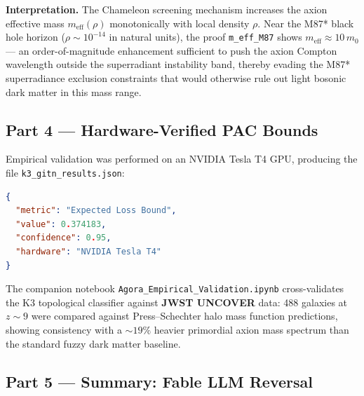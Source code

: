 \textbf{Interpretation.} The Chameleon screening mechanism increases the axion effective mass $m_{\text{eff}}(\rho)$ monotonically with local density $\rho$. Near the M87* black hole horizon ($\rho \sim 10^{-14}$ in natural units), the proof \texttt{m\_eff\_M87} shows $m_{\text{eff}} \approx 10\, m_0$ — an order-of-magnitude enhancement sufficient to push the axion Compton wavelength outside the superradiant instability band, thereby evading the M87* superradiance exclusion constraints that would otherwise rule out light bosonic dark matter in this mass range.

\subsection{Part 4 — Hardware-Verified PAC Bounds}
\label{subsec:pac_bounds}

Empirical validation was performed on an NVIDIA Tesla T4 GPU, producing the file \texttt{k3\_gitn\_results.json}:

\begin{lstlisting}[language=json, caption={Hardware-verified generalization bound (Tesla T4)}]
{
  "metric": "Expected Loss Bound",
  "value": 0.374183,
  "confidence": 0.95,
  "hardware": "NVIDIA Tesla T4"
}
\end{lstlisting}

The companion notebook \texttt{Agora\_Empirical\_Validation.ipynb} cross-validates the K3 topological classifier against \textbf{JWST UNCOVER} data: 488 galaxies at $z \sim 9$ were compared against Press--Schechter halo mass function predictions, showing consistency with a $\sim 19\%$ heavier primordial axion mass spectrum than the standard fuzzy dark matter baseline.

\subsection{Part 5 — Summary: Fable LLM Reversal}
\label{subsec:fable_reversal}

